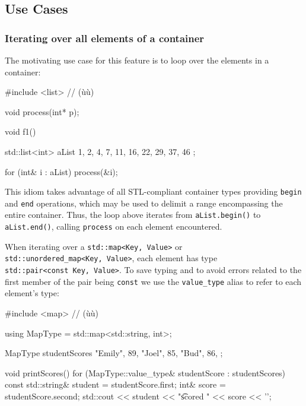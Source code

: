 {{\subsection[Use Cases]{Use Cases}\label{use-cases}

\subsubsection[Iterating over all elements of a container]{Iterating over all elements of a container}\label{iterating-over-all-elements-of-a-container}

The motivating use case for this feature is to loop over the elements in
a container:

\begin{emcppslisting}
#include <list>  // (ù{}ù)

void process(int* p);

void f1()
{
    std::list<int> aList{ 1, 2, 4, 7, 11, 16, 22, 29, 37, 46 };

    for (int& i : aList)
    {
        process(&i);
    }
}
\end{emcppslisting}
    

\noindent This idiom takes advantage of all STL-compliant container types
providing \lstinline!begin! and \lstinline!end! operations, which may be used
to delimit a range encompassing the entire container. Thus, the loop
above iterates from \lstinline!aList.begin()! to \lstinline!aList.end()!,
calling \lstinline!process! on each element encountered.

When iterating over a \lstinline!std::map<Key,!~\lstinline!Value>! or
\lstinline!std::unordered_map<Key,!~\lstinline!Value>!, each element has type
\lstinline!std::pair<const!~\lstinline!Key,!~\lstinline!Value>!. To save typing
and to avoid errors related to the first member of the pair being
\lstinline!const! we use the \lstinline!value_type! alias to refer to each
element's type:

\begin{emcppslisting}
#include <map>  // (ù{}ù)

using MapType = std::map<std::string, int>;

MapType studentScores
{
    {"Emily", 89},
    {"Joel",  85},
    {"Bud",   86},
};

void printScores()
{
    for (MapType::value_type& studentScore : studentScores)
    {
        const std::string& student = studentScore.first;
        int&               score   = studentScore.second;
        std::cout << student << "\t scored " << score << '\n';
    }
}
\end{emcppslisting}
    

}}
